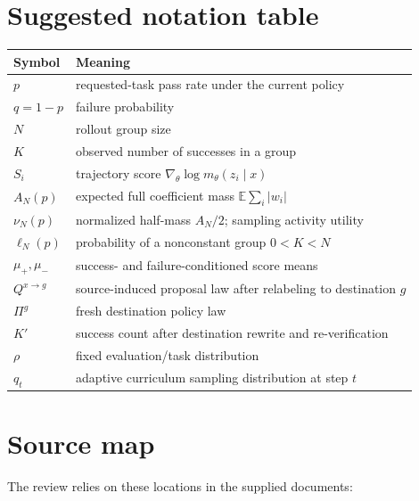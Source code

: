 \documentclass[11pt]{article}
\newcommand{\E}{\mathbb{E}}
\newcommand{\grad}{\nabla_{\!\theta}}
\theoremstyle{definition}
\theoremstyle{remark}
\begin{document}
\section{Suggested notation table}

\begin{table}[H]
\centering
\small
\begin{tabularx}{\textwidth}{@{}lX@{}}
\toprule
\textbf{Symbol} & \textbf{Meaning}\\
\midrule
$p$ & requested-task pass rate under the current policy\\
$q=1-p$ & failure probability\\
$N$ & rollout group size\\
$K$ & observed number of successes in a group\\
$S_i$ & trajectory score $\grad\log m_\theta(z_i\mid x)$\\
$A_N(p)$ & expected full coefficient mass $\E\sum_i|w_i|$\\
$\nu_N(p)$ & normalized half-mass $A_N/2$; sampling activity utility\\
$\ell_N(p)$ & probability of a nonconstant group $0<K<N$\\
$\mu_+,\mu_-$ & success- and failure-conditioned score means\\
$Q^{x\to g}$ & source-induced proposal law after relabeling to destination $g$\\
$\Pi^g$ & fresh destination policy law\\
$K'$ & success count after destination rewrite and re-verification\\
$\rho$ & fixed evaluation/task distribution\\
$q_t$ & adaptive curriculum sampling distribution at step $t$\\
\bottomrule
\end{tabularx}
\end{table}

\section{Source map}

The review relies on these locations in the supplied documents:
\end{document}
